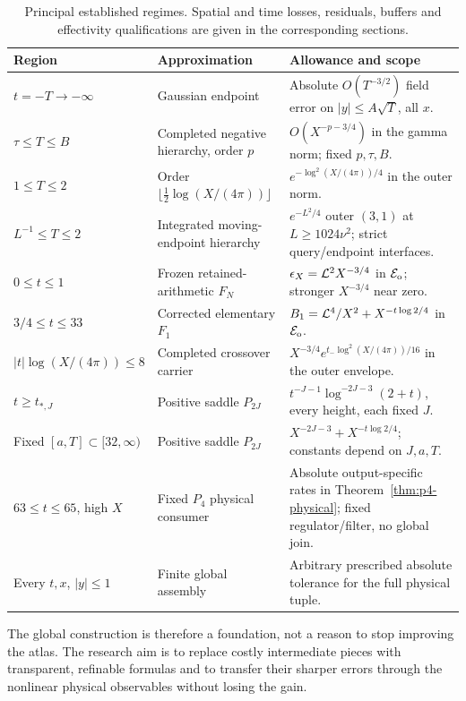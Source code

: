 \begin{table}[ht]
\centering\small
\begin{tabular}{p{}p{}p{}}
\toprule
Region & Approximation & Allowance and scope\\
\midrule
$t=-T\to-\infty$ & Gaussian endpoint & Absolute $O(T^{-3/2})$ field error on $|y|\le A\sqrt T$, all $x$.\\
$\tau\le T\le B$ & Completed negative hierarchy, order $p$ & $O(X^{-p-3/4})$ in the gamma norm; fixed $p,\tau,B$.\\
$1\le T\le2$ & Order $\lfloor\tfrac12\log(X/(4\pi))\rfloor$ & $e^{-\log^2(X/(4\pi))/4}$ in the outer norm.\\
$L^{-1}\le T\le2$ & Integrated moving-endpoint hierarchy & $e^{-L^2/4}$ outer $(3,1)$ at $L\ge1024\nu^2$; strict query/endpoint interfaces.\\
$0\le t\le1$ & Frozen retained-arithmetic $F_N$ & $\epsilon_X=\mathcal L^2X^{-3/4}$ in $\mathcal E_{\mathrm o}$; stronger $X^{-3/4}$ near zero.\\
$3/4\le t\le33$ & Corrected elementary $F_1$ & $B_1=\mathcal L^4/X^2+X^{-t\log2/4}$ in $\mathcal E_{\mathrm o}$.\\
$|t|\log(X/(4\pi))\le8$ & Completed crossover carrier & $X^{-3/4}e^{t_-\log^2(X/(4\pi))/16}$ in the outer envelope.\\
$t\ge t_{*,J}$ & Positive saddle $P_{2J}$ & $t^{-J-1}\log^{-2J-3}(2+t)$, every height, each fixed $J$.\\
Fixed $[a,T]\subset[32,\infty)$ & Positive saddle $P_{2J}$ & $X^{-2J-3}+X^{-t\log2/4}$; constants depend on $J,a,T$.\\
$63\le t\le65$, high $X$ & Fixed $P_4$ physical consumer & Absolute output-specific rates in Theorem~\ref{thm:p4-physical}; fixed regulator/filter, no global join.\\
Every $t,x$, $|y|\le1$ & Finite global assembly & Arbitrary prescribed absolute tolerance for the full physical tuple.\\
\bottomrule
\end{tabular}
\caption{Principal established regimes. Spatial and time losses, residuals,
buffers and effectivity qualifications are given in the corresponding sections.}
\label{tab:atlas}
\end{table}

The global construction is therefore a foundation, not a reason to stop
improving the atlas. The research aim is to replace costly intermediate
pieces with transparent, refinable formulas and to transfer their sharper
errors through the nonlinear physical observables without losing the gain.

